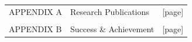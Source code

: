 \begin{tabular}{p{3.0cm}p{9.0cm}p{2.0cm}} 
APPENDIX A & Research Publications & [page]\\ %
\\
APPENDIX B & Success \& Achievement & [page]\\ %
\end{tabular}
